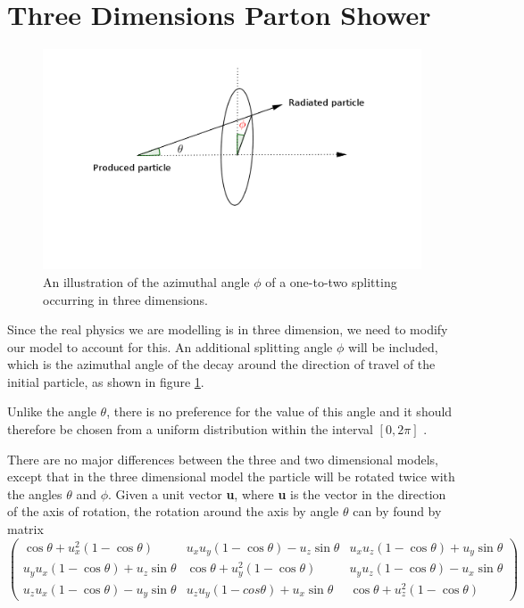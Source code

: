 \section{Three Dimensions Parton Shower}

\begin{figure}[hbtp]
\centering
\includegraphics[scale=.5]{images/three-dimentions.png}
\caption{An illustration of the azimuthal angle $\phi$ of a one-to-two splitting occurring in three dimensions.}\label{fig:3d}
\end{figure}
Since the real physics we are modelling is in three dimension, we need to modify our model to account for this. An additional splitting angle $\phi$ will be included, which is the azimuthal angle of the decay  around the direction of travel of the initial particle, as shown in figure \ref{fig:3d}.

Unlike the angle $\theta$, there is no preference for the value of this angle and it should therefore be chosen from a uniform distribution within the interval $[0,2\pi]$ \citep{Salam:2010zt}.

There are no major differences between the three and two dimensional models, except that in the three dimensional model the particle will be rotated twice with the angles $\theta$ and $\phi$. Given a unit vector \textbf{u}, where \textbf{u} is the vector in the direction of the axis of rotation,  the rotation around the axis by angle $\theta$ can by found by matrix       
\begin{equation} 
\begin{pmatrix}
\cos\theta + u^2_x(1-\cos\theta) & u_x u_y (1-\cos\theta) - u_z \sin\theta& u_x u_z(1-\cos\theta)+ u_y \sin\theta\\

u_y u_x (1 - \cos\theta) + u_z \sin\theta & \cos\theta + u_y^2 (1 - \cos\theta) & u_y u_z (1 - \cos\theta) - u_x \sin\theta \\

u_z u_x (1 - \cos\theta) - u_y \sin\theta & u_z u_y (1 - cos\theta) + u_x \sin\theta & \cos\theta + u_z^2 (1 - \cos\theta)
\end{pmatrix}
\end{equation}


